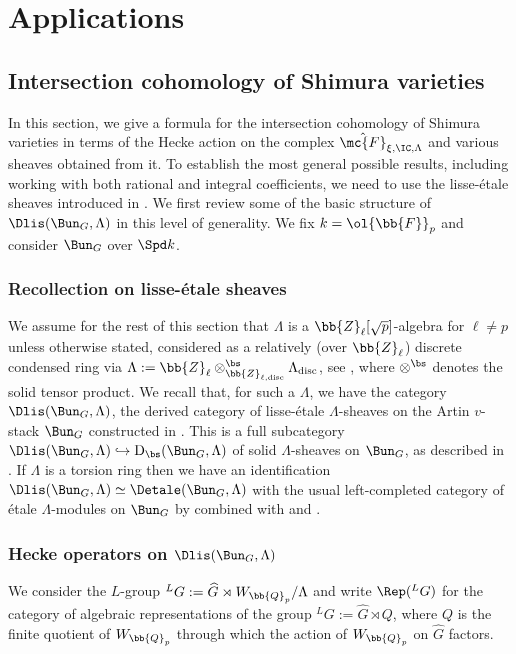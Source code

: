 \documentclass[letterpaper,11pt]{amsart}
\begin{document}
\section{Applications}\label{sec: applications}

\subsection{Intersection cohomology of Shimura varieties}

In this section, we give a formula for the intersection cohomology of Shimura varieties in terms of the Hecke action on the complex $\hat{\mc{F}}_{\xi, \IC,\Lambda}$ and various sheaves obtained from it. To establish the most general possible results, including working with both rational and integral coefficients, we need to use the lisse-\'etale sheaves introduced in \cite[Chapter VII]{FSGeomLLC}. We first review some of the basic structure of $\Dlis(\Bun_{G},\Lambda)$ in this level of generality. We fix $k=\ol{\bb{F}}_p$ and consider $\Bun_G$ over $\Spd k$.

\subsubsection{Recollection on lisse-\'etale sheaves}
We assume for the rest of this section that $\Lambda$ is a $\bb{Z}_{\ell}[\sqrt{p}]$-algebra for $\ell \neq p$ unless otherwise stated, considered as a relatively (over $\bb{Z}_\ell$) discrete condensed ring via $\Lambda:=\bb{Z}_{\ell}\otimes^{\bs}_{\bb{Z}_{\ell,\mathrm{disc}}}\Lambda_{\mathrm{disc}}$, see \cite[Chapter VII.6, 2nd paragraph]{FSGeomLLC}, where $\otimes^{\bs}$ denotes the solid tensor product. We recall that, for such a $\Lambda$, we have the category $\Dlis(\Bun_{G},\Lambda)$, the derived category of lisse-\'etale $\Lambda$-sheaves on the Artin $v$-stack $\Bun_{G}$ constructed in \cite[Definition~VII.6.1]{FSGeomLLC}. This is a full subcategory $\Dlis(\Bun_{G},\Lambda) \hookrightarrow \mathrm{D}_{\bs}(\Bun_{G},\Lambda)$ of solid $\Lambda$-sheaves on $\Bun_{G}$, as described in \cite[Definition~VII.1.10]{FSGeomLLC}. If $\Lambda$ is a torsion ring then we have an identification $\Dlis(\Bun_{G},\Lambda) \simeq \Detale(\Bun_{G},\Lambda)$ with the usual left-completed category of \'etale $\Lambda$-modules on $\Bun_{G}$ by \cite[Proposition~VII.6.6]{FSGeomLLC} combined with \cite[Proposition~V.3.5]{FSGeomLLC} and \cite[Theorem~V.3.7]{FSGeomLLC}.

\subsubsection{Hecke operators on \texorpdfstring{$\Dlis(\Bun_{G},\Lambda)$}{}}{\label{s: HeckeOperatorsandDlisse}}
We consider the $L$-group $\phantom{}^{L}G := \widehat{G} \rtimes W_{\bb{Q}_{p}}/\Lambda$ and write $\Rep(\phantom{}^{L}G)$ for the category of algebraic representations of the group $\phantom{}^{L}G := \widehat{G} \rtimes Q$, where $Q$ is the finite quotient of $W_{\bb{Q}_{p}}$ through which the action of $W_{\bb{Q}_{p}}$ on $\widehat{G}$ factors.
\end{document}

